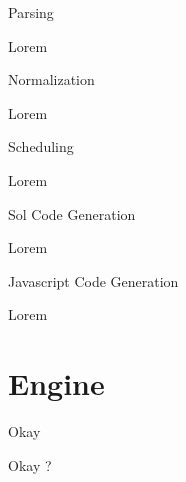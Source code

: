 \documentclass[ignorenonframetext,]{beamer}
\begin{document}
\begin{frame}[fragile]{Parsing}

Lorem

\end{frame}

\begin{frame}{Normalization}

Lorem

\end{frame}

\begin{frame}{Scheduling}

Lorem

\end{frame}

\begin{frame}{Sol Code Generation}

Lorem

\end{frame}

\begin{frame}{Javascript Code Generation}

Lorem

\section{Engine}

\end{frame}

\begin{frame}{Okay}

Okay ?

\end{frame}
\end{document}
